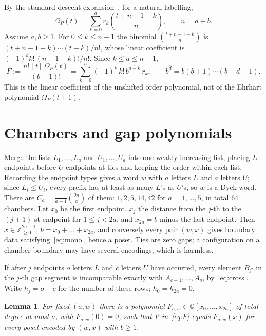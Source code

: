 \documentclass[11pt]{article}
\newtheorem{lemma}[theorem]{Lemma}
\theoremstyle{definition}
\theoremstyle{remark}
\newcommand{\rise}[2]{#1^{\overline{#2}}}
\begin{document}
By the standard descent expansion~\cite[Section~3.15]{Stanley}, for a
natural labelling,
\begin{equation}\label{eq:desc}
\Omega_P(t)=\sum_{k=0}^{a}r_k\binom{t+n-1-k}{n},\qquad n=a+b.
\end{equation}
Assume $a,b\ge1$. For $0\le k\le n-1$ the binomial
$\binom{t+n-1-k}{n}$ is $(t+n-1-k)\cdots(t-k)/n!$, whose linear
coefficient is $(-1)^kk!\,(n-1-k)!/n!$. Since $k\le a\le n-1$,
\begin{equation}\label{eq:F}
F:=\frac{n!\,[t]\,\Omega_P(t)}{(b-1)!}=\sum_{k=0}^{a}(-1)^k\,k!\,\rise b{a-k}\,r_k,
\qquad \rise bd=b(b+1)\cdots(b+d-1).
\end{equation}
This is the linear coefficient of the unshifted order polynomial, not of
the Ehrhart polynomial $\Omega_P(t+1)$.

\section{Chambers and gap polynomials}\label{sec:chambers}

Merge the lists $L_1,\dots,L_a$ and $U_1,\dots,U_a$ into one weakly
increasing list, placing $L$-endpoints before $U$-endpoints at ties and
keeping the order within each list. Recording the endpoint types gives a
word $w$ with $a$ letters $L$ and $a$ letters $U$; since $L_i\le U_i$,
every prefix has at least as many $L$'s as $U$'s, so $w$ is a Dyck word.
There are $C_a=\frac1{a+1}\binom{2a}a$ of them: $1,2,5,14,42$ for
$a=1,\dots,5$, in total $64$ chambers. Let $x_0$ be the first endpoint,
$x_j$ the distance from the $j$-th to the $(j+1)$-st endpoint for
$1\le j<2a$, and $x_{2a}=b$ minus the last endpoint. Then
$x\in\mathbb Z_{\ge0}^{2a+1}$, $b=x_0+\dots+x_{2a}$, and conversely every
pair $(w,x)$ gives boundary data satisfying~\eqref{eq:mono}, hence a
poset. Ties are zero gaps; a configuration on a chamber boundary may
have several encodings, which is harmless.

If after $j$ endpoints $o$ letters $L$ and $c$ letters $U$ have
occurred, every element $B_{j'}$ in the $j$-th gap segment is
incomparable exactly with $A_{c+1},\dots,A_o$, by~\eqref{eq:cross}. Write
$h_j=o-c$ for the number of these rows; $h_0=h_{2a}=0$.

\begin{lemma}\label{lem:poly}
For fixed $(a,w)$ there is a polynomial $F_{a,w}\in\mathbb Q[x_0,\dots,x_{2a}]$
of total degree at most $a$, with $F_{a,w}(0)=0$, such that $F$
in~\eqref{eq:F} equals $F_{a,w}(x)$ for every poset encoded by $(w,x)$
with $b\ge1$.
\end{lemma}
\end{document}
